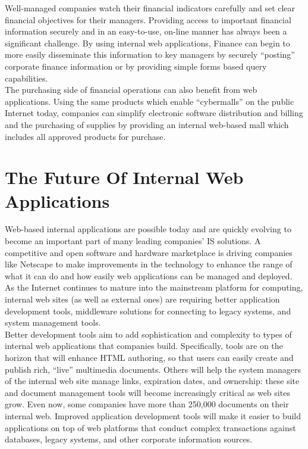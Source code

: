 Well-managed companies watch their financial indicators carefully and
set clear financial objectives for their managers. Providing access to
important financial information securely and in an easy-to-use, on-line
manner has always been a significant challenge. By using internal web
applications, Finance can begin to more easily disseminate this
information to key managers by securely ``posting'' corporate finance
information or by providing simple forms based query capabilities.\\

The purchasing side of financial operations can also benefit from web
applications. Using the same products which enable ``cybermalls'' on
the public Internet today, companies can simplify electronic software
distribution and billing and the purchasing of supplies by providing an
internal web-based mall which includes all approved products for
purchase.


\section{The Future Of Internal Web Applications}

Web-based internal applications are possible today and are quickly
evolving to become an important part of many leading companies' IS
solutions. A competitive and open software and hardware marketplace is
driving companies like Netscape to make improvements in the technology
to enhance the range of what it can do and how easily web applications
can be managed and deployed. As the Internet continues to mature into
the mainstream platform for computing, internal web sites (as well as
external ones) are requiring better application development tools,
middleware solutions for connecting to legacy systems, and system
management tools.\\

Better development tools aim to add sophistication and complexity to
types of internal web applications that companies build. Specifically,
tools are on the horizon that will enhance HTML authoring, so that
users can easily create and publish rich, ``live'' multimedia
documents. Others will help the system managers of the internal web
site manage links, expiration dates, and ownership: these site and
document management tools will become increasingly critical as web
sites grow. Even now, some companies have more than 250,000 documents
on their internal web. Improved application development tools will make
it easier to build applications on top of web platforms that conduct
complex transactions against databases, legacy systems, and other
corporate information sources.\\

